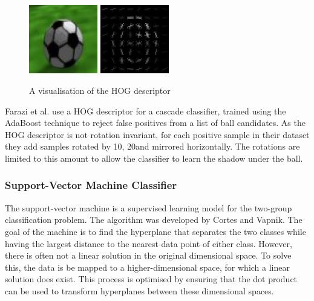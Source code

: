 \begin{figure}[ht]
\includegraphics[width=3cm]{images/hog_ball.png}
\includegraphics[width=3cm]{images/hog.png}
\centering
\caption{A visualisation of the HOG descriptor}
\end{figure}

Farazi et al. \cite{Farazi2016} use a HOG descriptor for a cascade classifier, trained using the AdaBoost technique to reject false positives from a list of ball candidates. As the HOG descriptor is not rotation invariant, for each positive sample in their dataset they add samples rotated by 10\degree, 20\degree and mirrored horizontally. The rotations are limited to this amount to allow the classifier to learn the shadow under the ball.

\subsubsection{Support-Vector Machine Classifier}

The support-vector machine is a supervised learning model for the two-group classification problem. The algorithm was developed by Cortes and Vapnik\cite{Cortes1995}. The goal of the machine is to find the hyperplane that separates the two classes while having the largest distance to the nearest data point of either class. However, there is often not a linear solution in the original dimensional space. To solve this, the data is be mapped to a higher-dimensional space, for which a linear solution does exist. This process is optimised by ensuring that the dot product can be used to transform hyperplanes between these dimensional spaces.

